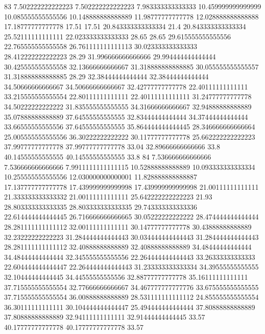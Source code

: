 83 7.502222222222223 7.502222222222223 7.983333333333333 10.459999999999999 10.085555555555556 10.148888888888889 11.98777777777778 12.028888888888888 17.18777777777778 17.51 17.51 20.843333333333334 21.4 20.843333333333334 25.52111111111111 22.023333333333333 28.65 28.65 29.615555555555556 22.765555555555558 26.761111111111113 30.023333333333333 28.412222222222223 28.29 31.996666666666666 29.994444444444444 30.425555555555558 32.13666666666667 31.318888888888885 30.055555555555557 31.318888888888885 28.29 32.38444444444444 32.38444444444444 34.50666666666667 34.50666666666667 32.42777777777778 22.40111111111111 33.215555555555554 22.80111111111111 22.40111111111111 31.24777777777778 34.50222222222222 31.835555555555555 34.31666666666667 32.94888888888889 35.07888888888889 37.64555555555555 32.83444444444444 34.37444444444444 33.66555555555556 37.64555555555555 35.864444444444445 28.346666666666664 25.005555555555556 36.30222222222222 30.11777777777778 25.662222222222223 37.99777777777778 37.99777777777778 33.04 32.89666666666666 33.8 40.14555555555555 40.14555555555555 33.8
84 7.536666666666666 7.536666666666666 7.9911111111111115 10.52888888888889 10.093333333333334 10.255555555555556 12.030000000000001 11.828888888888887 17.137777777777778 17.439999999999998 17.439999999999998 21.00111111111111 21.333333333333332 21.00111111111111 25.642222222222223 21.93 28.803333333333335 28.803333333333335 29.743333333333336 22.614444444444445 26.716666666666665 30.05222222222222 28.474444444444444 28.281111111111112 32.00111111111111 30.14777777777778 30.43888888888889 32.23222222222223 31.284444444444443 30.034444444444443 31.284444444444443 28.281111111111112 32.40888888888889 32.40888888888889 34.48444444444444 34.48444444444444 32.345555555555556 22.264444444444443 33.26333333333333 22.604444444444447 22.264444444444443 31.233333333333334 34.39555555555555 32.10444444444445 34.44555555555556 32.88777777777778 35.16111111111111 37.715555555555554 32.77666666666667 34.467777777777776 33.675555555555555 37.715555555555554 36.00888888888889 28.531111111111112 24.855555555555554 36.30111111111111 30.104444444444447 25.494444444444444 37.80888888888889 37.80888888888889 32.94111111111111 32.91444444444445 33.57 40.17777777777778 40.17777777777778 33.57
